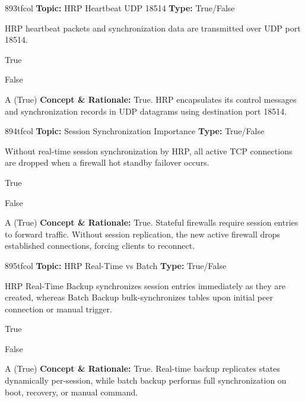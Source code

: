 \begin{qcard}{893}{tfcol}
\textcolor{darkslate!75}{\small\textbf{Topic:} HRP Heartbeat UDP 18514 \hfill \textbf{Type:} True/False}\vspace{0.4em}\par
HRP heartbeat packets and synchronization data are transmitted over UDP port 18514.
\begin{qoptions}
\item True
\item False
\end{qoptions}
\end{qcard}
\nopagebreak
\begin{explainbox}{A (True)}
\textbf{Concept \& Rationale:} True. HRP encapsulates its control messages and synchronization records in UDP datagrams using destination port 18514.
\end{explainbox}

\begin{qcard}{894}{tfcol}
\textcolor{darkslate!75}{\small\textbf{Topic:} Session Synchronization Importance \hfill \textbf{Type:} True/False}\vspace{0.4em}\par
Without real-time session synchronization by HRP, all active TCP connections are dropped when a firewall hot standby failover occurs.
\begin{qoptions}
\item True
\item False
\end{qoptions}
\end{qcard}
\nopagebreak
\begin{explainbox}{A (True)}
\textbf{Concept \& Rationale:} True. Stateful firewalls require session entries to forward traffic. Without session replication, the new active firewall drops established connections, forcing clients to reconnect.
\end{explainbox}

\begin{qcard}{895}{tfcol}
\textcolor{darkslate!75}{\small\textbf{Topic:} HRP Real-Time vs Batch \hfill \textbf{Type:} True/False}\vspace{0.4em}\par
HRP Real-Time Backup synchronizes session entries immediately as they are created, whereas Batch Backup bulk-synchronizes tables upon initial peer connection or manual trigger.
\begin{qoptions}
\item True
\item False
\end{qoptions}
\end{qcard}
\nopagebreak
\begin{explainbox}{A (True)}
\textbf{Concept \& Rationale:} True. Real-time backup replicates states dynamically per-session, while batch backup performs full synchronization on boot, recovery, or manual command.
\end{explainbox}


